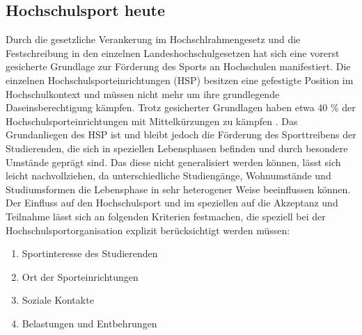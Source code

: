 \subsection{Hochschulsport heute}
Durch die gesetzliche Verankerung im Hochschlrahmengesetz und die Festschreibung in den einzelnen Landeshochschulgesetzen hat sich eine vorerst gesicherte Grundlage zur Förderung des Sports an Hochschulen manifestiert. Die einzelnen Hochschulsporteinrichtungen (HSP) besitzen eine gefestigte Position im Hochschulkontext und müssen nicht mehr um ihre grundlegende Daseinsberechtigung kämpfen. Trotz gesicherter Grundlagen haben etwa 40 \% der Hochschulsporteinrichtungen mit Mittelkürzungen zu kämpfen \cite[][S.9]{Hachmeister.2004}.
Das Grundanliegen des HSP ist und bleibt jedoch die Förderung des Sporttreibens der Studierenden, die sich in speziellen Lebensphasen befinden und durch besondere Umstände geprägt sind. Das diese nicht generalisiert werden können, lässt sich leicht nachvollziehen, da unterschiedliche Studiengänge, Wohnumstände und Studiumsformen die Lebensphase in sehr heterogener Weise beeinflussen können. Der Einfluss auf den Hochschulsport und im speziellen auf die Akzeptanz und Teilnahme lässt sich an folgenden Kriterien festmachen, die speziell bei der Hochschulsportorganisation explizit berücksichtigt werden müssen:

\begin{enumerate}
	\item Sportinteresse des Studierenden
	\item Ort der Sporteinrichtungen
	\item Soziale Kontakte
	\item Belastungen und Entbehrungen
\end{enumerate}

